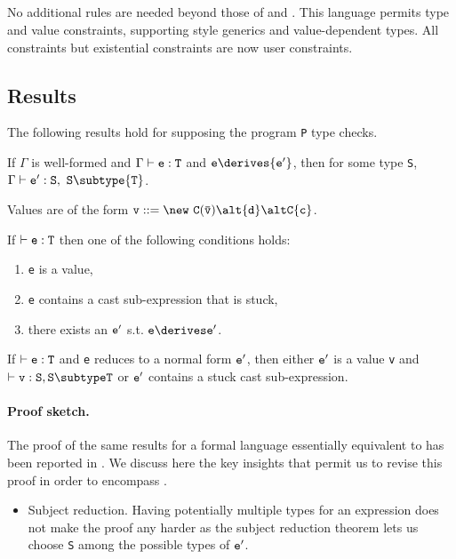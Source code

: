 {\subsection{\FXGD} 

No additional rules are needed beyond those of \FXG{} and \FXD{}. This
language permits type and value constraints, supporting \FGJ{} style
generics and value-dependent types. All constraints but existential constraints are now user constraints.

\subsection{Results}
The following results hold for \FXGD supposing the program {\tt P} type checks.

\begin{theorem} If $\Gamma$ is well-formed and $\Gamma \vdash {\tt e:T}$ and ${\tt e} \derives {\tt e'}$, then
for some type {\tt S}, $\Gamma \vdash {\tt {\tt e}':{\tt S}}\comma{\tt S} \subtype {\tt T}$.
\end{theorem}

Values are of the form $\tt v ::= \new\ C(\bar{\tt v}) \alt {\tt d} \alt C\{c\}$.

\begin{theorem}[Progress]
If $\vdash {\tt e:T}$ then one of the following conditions holds:
\begin{enumerate}
\item {\tt e} is a value,
\item {\tt e} contains a cast sub-expression that is stuck,
\item there exists an $\tt e'$ s.t. $\tt e\derives e'$.
\end{enumerate}
\end{theorem}

\begin{theorem}
If $\vdash {\tt e:T}$ and {\tt e}
reduces to a normal form ${\tt e'}$, then
either $\tt e'$ is a value {\tt v} and $\vdash {\tt v:S},{\tt S\subtype T}$ or
${\tt e'}$ contains  a stuck cast sub-expression.
\end{theorem}

\paragraph{Proof sketch.} The proof of the same results for a
formal language essentially equivalent to \FXD{} has been
reported in \cite{constrained-types}. We discuss here the key
insights that permit us to revise this proof in order to encompass \FXGD{}.
\begin{itemize}
\item Subject reduction. Having potentially multiple types for
an expression does not make the proof any harder as the subject
reduction theorem lets us choose {\tt S} among the possible types of ${\tt e}'$.


\end{itemize}}
